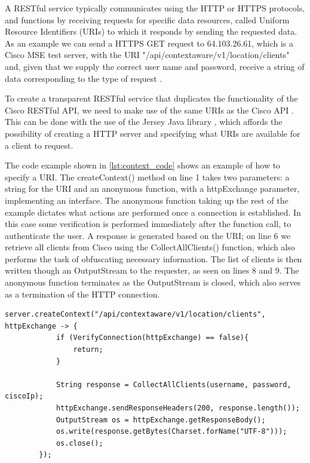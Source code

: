 A RESTful service typically communicates using the HTTP or HTTPS protocols, and functions by receiving requests for specific data resources, called Uniform Resource Identifiers (URIs) to which it responds by sending the requested data. As an example we can send a HTTPS GET request to 64.103.26.61, which is a Cisco MSE test server, with the URI "/api/contextaware/v1/location/clients" and, given that we supply the correct user name and password, receive a string of data corresponding to the type of request \cite{restful_oracle}.

To create a transparent RESTful service that duplicates the functionality of the Cisco RESTful API, we need to make use of the same URIs as the Cisco API \cite{cisco_mse_api}. This can be done with the use of the Jersey Java library \cite{restful_in_java}, which affords the possibility of creating a HTTP server and specifying what URIs are available for a client to request.

The code example shown in \cref{lst:context_code} shows an example of how to specify a URI. The createContext() method on line 1 takes two parameters: a string for the URI and an anonymous function, with a httpExchange parameter, implementing an interface. The anonymous function taking up the rest of the example dictates what actions are performed once a connection is established. In this case some verification is performed immediately after the function call, to authenticate the user. A response is generated based on the URI; on line 6 we retrieve all clients from Cisco using the CollectAllClients() function, which also performs the task of obfuscating necessary information. The list of clients is then written though an OutputStream to the requester, as seen on lines 8 and 9. The anonymous function terminates as the OutputStream is closed, which also serves as a termination of the HTTP connection. 

\begin{lstlisting}[caption={Adding a URI},label={lst:context_code},language=inc_Java]
server.createContext("/api/contextaware/v1/location/clients", httpExchange -> {
            if (VerifyConnection(httpExchange) == false){
                return;
            }

            String response = CollectAllClients(username, password, ciscoIp);
            httpExchange.sendResponseHeaders(200, response.length());
            OutputStream os = httpExchange.getResponseBody();
            os.write(response.getBytes(Charset.forName("UTF-8")));
            os.close();
        });
\end{lstlisting}

